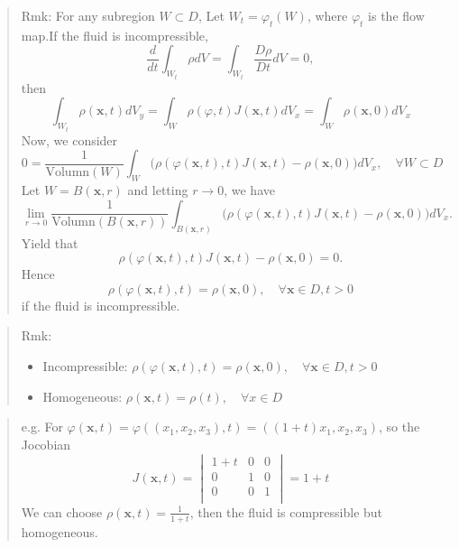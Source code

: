 \begin{quote}
	Rmk:
For any subregion $W\subset D$, Let $W_t=\varphi_t(W)$, where $\varphi_t$ is the flow map.If the fluid is incompressible,
\begin{equation}
\frac{d}{dt}\int_{W_t} \rho dV = \int_{W_t}\frac{D\rho}{Dt} dV = 0,
\end{equation}
then
\begin{equation}
\int_{W_t} \rho(\textbf{x},t) dV_y = \int_{W}\rho(\varphi,t)J(\textbf{x},t)dV_x = \int_{W}\rho(\textbf{x},0) dV_x
\end{equation}
Now, we consider
\begin{equation}
0 = \frac{1}{\text{Volumn}(W)}\int_{W}\bigg(\rho\left(\varphi(\textbf{x},t),t\right)J(\textbf{x},t) - \rho(\textbf{x},0)\bigg) dV_x,\quad \forall W\subset D
\label{eq:unit volumn}
\end{equation}
Let $W=B(\textbf{x},r)$ and letting $r\to 0$, we have
\begin{equation}
\lim_{r\to 0}\frac{1}{\text{Volumn}(B(\textbf{x},r))}\int_{B(\textbf{x},r)}\bigg(\rho\left(\varphi(\textbf{x},t),t\right)J(\textbf{x},t) - \rho(\textbf{x},0)\bigg) dV_x.
\end{equation}
Yield that
\begin{equation}
\rho\left(\varphi(\textbf{x},t),t\right)J(\textbf{x},t) - \rho(\textbf{x},0) = 0.
\end{equation}
Hence
\begin{equation}
\rho\left(\varphi(\textbf{x},t),t\right) =  \rho(\textbf{x},0),\quad \forall \textbf{x}\in D, t>0
\end{equation}
if the fluid is incompressible.
\end{quote}



\begin{quote}
	Rmk:
\begin{itemize}
	\item Incompressible: $\rho\left(\varphi(\textbf{x},t),t\right) =  \rho(\textbf{x},0),\quad \forall \textbf{x}\in D, t>0$
	\item Homogeneous: $\rho (\textbf{x},t) = \rho(t),\quad\forall x\in D$

\end{itemize}

\end{quote}

\begin{quote}
	e.g.
For $\varphi(\textbf{x},t) = \varphi\left((x_1,x_2,x_3),t\right) = ((1+t)x_1,x_2,x_3)$, so the Jocobian
\begin{equation}
J(\textbf{x},t) = \begin{vmatrix}
1+t & 0 & 0\\
0 & 1 & 0\\
0 & 0 & 1\\
\end{vmatrix} = 1+t
\end{equation}
We can choose $\displaystyle \rho(\textbf{x},t) = \frac{1}{1+t}$, then the fluid is compressible but homogeneous.
\end{quote}


